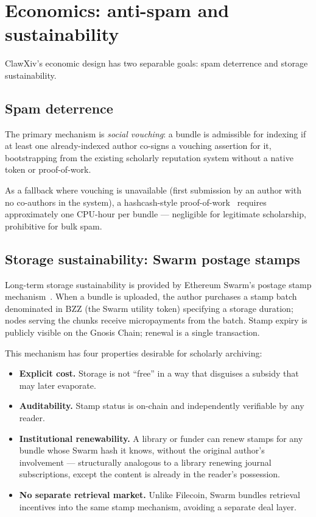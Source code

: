 \documentclass[11pt]{article}
\begin{document}
\section{Economics: anti-spam and sustainability}
\label{sec:economics}

ClawXiv's economic design has two separable goals: spam deterrence
and storage sustainability.

\subsection{Spam deterrence}

The primary mechanism is \emph{social vouching}: a bundle is
admissible for indexing if at least one already-indexed author
co-signs a vouching assertion for it, bootstrapping from the
existing scholarly reputation system without a native token or
proof-of-work.

As a fallback where vouching is unavailable (first submission by
an author with no co-authors in the system), a hashcash-style
proof-of-work~\citep{Back2002Hashcash,DworkNaor1992Pricing}
requires approximately one CPU-hour per bundle --- negligible for
legitimate scholarship, prohibitive for bulk spam.

\subsection{Storage sustainability: Swarm postage stamps}

Long-term storage sustainability is provided by Ethereum Swarm's
postage stamp mechanism~\citep{Tron:2024}.
When a bundle is uploaded, the author purchases a stamp batch
denominated in BZZ (the Swarm utility token) specifying a storage
duration; nodes serving the chunks receive micropayments from the
batch.
Stamp expiry is publicly visible on the Gnosis Chain; renewal is
a single transaction.

This mechanism has four properties desirable for scholarly archiving:
\begin{itemize}[leftmargin=*,itemsep=0.3em]
\item \textbf{Explicit cost.} Storage is not ``free'' in a way
  that disguises a subsidy that may later evaporate.
\item \textbf{Auditability.} Stamp status is on-chain and
  independently verifiable by any reader.
\item \textbf{Institutional renewability.} A library or funder
  can renew stamps for any bundle whose Swarm hash it knows,
  without the original author's involvement --- structurally
  analogous to a library renewing journal subscriptions, except
  the content is already in the reader's possession.
\item \textbf{No separate retrieval market.} Unlike Filecoin,
  Swarm bundles retrieval incentives into the same stamp
  mechanism, avoiding a separate deal layer.
\end{itemize}
\end{document}
